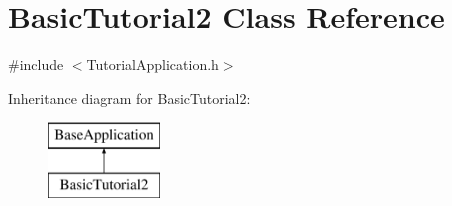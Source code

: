 \hypertarget{class_basic_tutorial2}{}\section{Basic\+Tutorial2 Class Reference}
\label{class_basic_tutorial2}


{\ttfamily \#include $<$Tutorial\+Application.\+h$>$}

Inheritance diagram for Basic\+Tutorial2\+:\begin{figure}[H]
\begin{center}
\leavevmode
\includegraphics[height=2.000000cm]{class_basic_tutorial2}
\end{center}
\end{figure}
